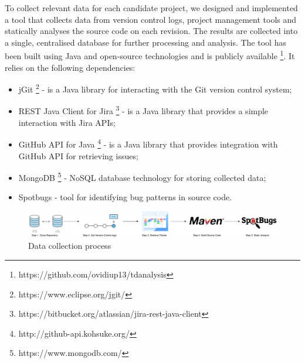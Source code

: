 \documentclass{mpaper}
\begin{document}
To collect relevant data for each candidate project, we designed and implemented
a tool that collects data from version control logs, project management tools
and statically analyses the source code on each revision. The results are
collected into a single, centralised database for further processing and
analysis. The tool has been built using Java and open-source technologies and
is publicly available \footnote{https://github.com/ovidiup13/tdanalysis}. It
relies on the following dependencies:

\begin{itemize}
  \item jGit \footnote{https://www.eclipse.org/jgit/} - is a Java library for
  interacting with the Git version control system;
  \item REST Java Client for Jira
  \footnote{https://bitbucket.org/atlassian/jira-rest-java-client} - is a Java
  library that provides a simple interaction with Jira APIs;
  \item GitHub API for Java \footnote{http://github-api.kohsuke.org/} - is a
  Java library that provides integration with GitHub API for retrieving issues;
  \item MongoDB \footnote{https://www.mongodb.com/} - NoSQL database technology
  for storing collected data;
  \item Spotbugs - tool for identifying bug patterns in source code.
\end{itemize}

\begin{figure}[ht]
	\centering
	\includegraphics[width=\linewidth]{diagrams/collection-pipeline.pdf}
	\caption{Data collection process}
	\label{fig:data-collection}
\end{figure}
\end{document}
